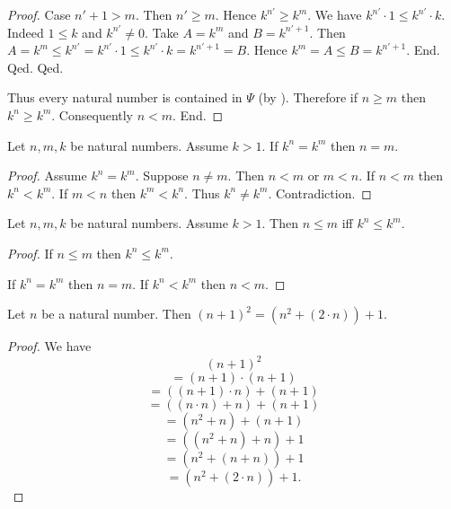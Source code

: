 \documentclass[10pt]{article}
\begin{document}
\begin{forthel}
\begin{proof}
            Case $n' + 1 > m$.
              Then $n' \geq m$.
              Hence $k^{n'} \geq k^{m}$.
              We have $k^{n'} \cdot 1 \leq k^{n'} \cdot k$.
              Indeed $1 \leq k$ and $k^{n'} \neq 0$.
              Take $A = k^{m}$ and $B = k^{n' + 1}$. %
              Then $A
                = k^{m}
                \leq k^{n'}
                = k^{n'} \cdot 1
                \leq k^{n'} \cdot k
                = k^{n' + 1}
                = B$.
              Hence $k^{m} = A \leq B = k^{n' + 1}$.
            End.
          Qed.
        Qed.

        Thus every natural number is contained in $\Psi$ (by ).
        Therefore if $n \geq m$ then $k^{n} \geq k^{m}$.
        Consequently $n < m$.
      End.
    \end{proof}
  \end{forthel}

  \begin{forthel}
    \begin{corollary}
      Let $n, m, k$ be natural numbers.
      Assume $k > 1$.
      If $k^{n} = k^{m}$ then $n = m$.
    \end{corollary}
    \begin{proof}
      Assume $k^{n} = k^{m}$.
      Suppose $n \neq m$.
      Then $n < m$ or $m < n$.
      If $n < m$ then $k^{n} < k^{m}$.
      If $m < n$ then $k^{m} < k^{n}$.
      Thus $k^{n} \neq k^{m}$.
      Contradiction.
    \end{proof}
  \end{forthel}

  \begin{forthel}
    \begin{corollary}
      Let $n, m, k$ be natural numbers.
      Assume $k > 1$.
      Then $n \leq m$ iff $k^{n} \leq k^{m}$.
    \end{corollary}
    \begin{proof}
      If $n \leq m$ then $k^{n} \leq k^{m}$.

      If $k^{n} = k^{m}$ then $n = m$.
      If $k^{n} < k^{m}$ then $n < m$.
    \end{proof}
  \end{forthel}

  \begin{forthel}
    \begin{proposition}
      Let $n$ be a natural number.
      Then $(n + 1)^{2} = (n^{2} + (2 \cdot n)) + 1$.
    \end{proposition}
    \begin{proof}
      We have
      \[  (n + 1)^{2}                       \]
      \[    = (n + 1) \cdot (n + 1)         \]
      \[    = ((n + 1) \cdot n) + (n + 1)   \]
      \[    = ((n \cdot n) + n) + (n + 1)   \]
      \[    = (n^{2} + n) + (n + 1)         \]
      \[    = ((n^{2} + n) + n) + 1         \]
      \[    = (n^{2} + (n + n)) + 1         \]
      \[    = (n^{2} + (2 \cdot n)) + 1.    \]
    \end{proof}
  \end{forthel}
\end{document}
